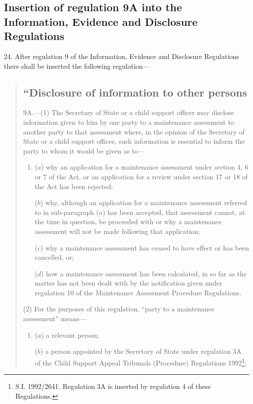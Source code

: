 \documentclass[12pt,a4paper]{article}
\begin{document}
\subsection[24. Insertion of regulation 9A into the Information, Evidence and Disclosure Regulations]{Insertion of regulation 9A into the Information, Evidence and Disclosure Regulations}

24.  After regulation 9 of the Information, Evidence and Disclosure Regulations there shall be inserted the following regulation—
\begin{quotation}
\subsection*{“Disclosure of information to other persons}

9A.—(1) The Secretary of State or a child support officer may disclose information given to him by one party to a maintenance assessment to another party to that assessment where, in the opinion of the Secretary of State or a child support officer, such information is essential to inform the party to whom it would be given as to—
\begin{enumerate}\item[]
($a$) why an application for a maintenance assessment under section 4, 6 or 7 of the Act, or an application for a review under section 17 or 18 of the Act has been rejected;

($b$) why, although an application for a maintenance assessment referred to in sub-paragraph ($a$) has been accepted, that assessment cannot, at the time in question, be proceeded with or why a maintenance assessment will not be made following that application;

($c$) why a maintenance assessment has ceased to have effect or has been cancelled, or;

($d$) how a maintenance assessment has been calculated, in so far as the matter has not been dealt with by the notification given under regulation 10 of the Maintenance Assessment Procedure Regulations.
\end{enumerate}

(2) For the purposes of this regulation, “party to a maintenance assessment” means—
\begin{enumerate}\item[]
($a$) a relevant person;

($b$) a person appointed by the Secretary of State under regulation 3A of the Child Support Appeal Tribunals (Procedure) Regulations 1992\footnote{\frenchspacing S.I. 1992/2641. Regulation 3A is inserted by regulation 4 of these Regulations.};


\end{enumerate}
\end{quotation}
\end{document}
